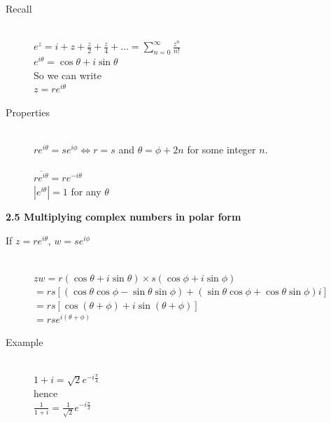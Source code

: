 \documentclass[]{article}
\begin{document}
		\begin{description}
			\item[Recall]\hfill\\
				$e^z=i+z+\frac{z}{2}+\frac{z}{4}+...=\sum\limits^\infty_{n=0}\frac{z^n}{n!}$\\
				$e^{i\theta}=\cos\theta+i\sin\theta$\\
				So we can write\\
				$z=re^{i\theta}$
			\item[Properties]\hfill\\
				$re^{i\theta}=se^{i\phi}\Leftrightarrow r=s$ and $\theta=\phi+2n$ for some integer $n$.\\\\
				$\overline{re^{i\theta}}=re^{-i\theta}$\\
				$|e^{i\theta}|=1$ for any $\theta$\\
		\end{description}
		\noindent\large{\bf 2.5 Multiplying complex numbers in polar form}
		\normalsize
		\begin{description}
			\item[If $z=re^{i\theta}$, $w=se^{i\phi}$]\hfill\\
				$zw=r(\cos\theta+i\sin\theta)\times s(\cos\phi+i\sin\phi)$\\
				$=rs[(\cos\theta\cos\phi-\sin\theta\sin\phi)+(\sin\theta\cos\phi+\cos\theta\sin\phi)i]$\\
				$=rs[\cos(\theta+\phi)+i\sin(\theta+\phi)]$\\
				$=rse^{i(\theta+\phi)}$
			
			\item[Example]\hfill\\
				$1+i=\sqrt{2}e^{-i\frac{\pi}{4}}$\\
				hence\\
				$\frac{1}{1+i}=\frac{1}{\sqrt{2}}e^{-i\frac{\pi}{4}}$
		\end{description}
\end{document}
